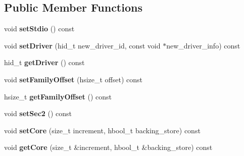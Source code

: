 \subsection*{Public Member Functions}
\begin{DoxyCompactItemize}
\item 
\mbox{\label{class_h5_1_1_file_acc_prop_list_a4c521836c5a0b26ef1308f8aa2c5fa60}} 
void {\bfseries set\+Stdio} () const
\item 
\mbox{\label{class_h5_1_1_file_acc_prop_list_ad4b3a3ef6c4bf48dc61dacb2532fd8d1}} 
void {\bfseries set\+Driver} (hid\+\_\+t new\+\_\+driver\+\_\+id, const void $\ast$new\+\_\+driver\+\_\+info) const
\item 
\mbox{\label{class_h5_1_1_file_acc_prop_list_a1e7bfe651b895aac4c2a31427a85b0f0}} 
hid\+\_\+t {\bfseries get\+Driver} () const
\item 
\mbox{\label{class_h5_1_1_file_acc_prop_list_a82c89cd7c0ca3256e793f7630d3aaf17}} 
void {\bfseries set\+Family\+Offset} (hsize\+\_\+t offset) const
\item 
\mbox{\label{class_h5_1_1_file_acc_prop_list_ab7e2702ed9c5e4940fff289bbe88e9ec}} 
hsize\+\_\+t {\bfseries get\+Family\+Offset} () const
\item 
\mbox{\label{class_h5_1_1_file_acc_prop_list_a515207f6e67b74cc5bf63def0cb3b562}} 
void {\bfseries set\+Sec2} () const
\item 
\mbox{\label{class_h5_1_1_file_acc_prop_list_a99589c117171152687f9025f724656d5}} 
void {\bfseries set\+Core} (size\+\_\+t increment, hbool\+\_\+t backing\+\_\+store) const
\item 
\mbox{\label{class_h5_1_1_file_acc_prop_list_a9d327e85ef34e56d17b8cfb2a4648e2f}} 
void {\bfseries get\+Core} (size\+\_\+t \&increment, hbool\+\_\+t \&backing\+\_\+store) const
\item 
\mbox{\label{class_h5_1_1_file_acc_prop_list_ad4d6b076ce0c0eb19eb10670e5fad79d}} 

\end{DoxyCompactItemize}
